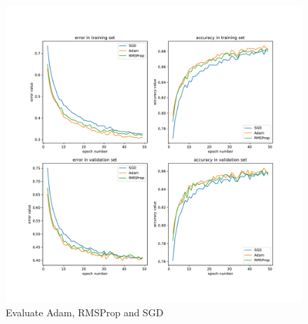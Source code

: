 \documentclass{article}
\begin{document}
\begin{figure}[tb]
\begin{center}
\centerline{\includegraphics[width=\columnwidth]{fig/lr.pdf}}
\caption{Evaluate Adam, RMSProp and SGD}
\label{fig:lr}
\end{center}
\end{figure} 




\end{document}
